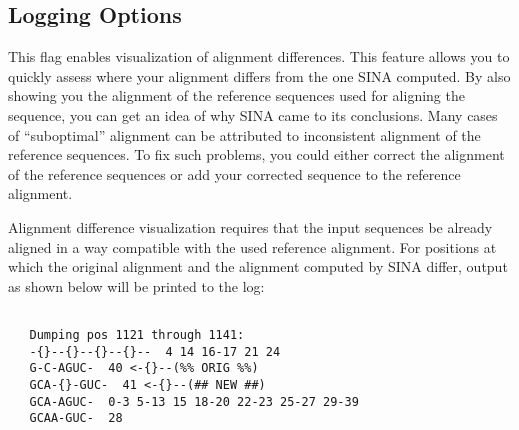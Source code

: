\documentclass[english,a4paper]{article}
\begin{document}
\subsection{Logging Options}
\begin{Description}
\item[\Opt{-{}-show-diff}] 
This flag enables visualization of alignment differences. This feature allows you to 
quickly assess where your alignment differs from the one SINA computed. By also showing you the alignment of 
the reference sequences used for aligning the sequence, you can get an idea of why SINA came to its conclusions.
Many cases of ``suboptimal'' alignment can be attributed to inconsistent alignment of the reference sequences. 
To fix such problems, you could either correct the alignment of the reference sequences or add your corrected
sequence to the reference alignment. 

Alignment difference visualization requires that the input sequences be 
already aligned in a way compatible with the used reference alignment. For positions at which the original alignment and
the alignment computed by SINA differ, output as shown below will be printed to the log:
\begin{verbatim}

   Dumping pos 1121 through 1141:
   -{}--{}--{}--{}--  4 14 16-17 21 24
   G-C-AGUC-  40 <-{}--(%% ORIG %%)
   GCA-{}-GUC-  41 <-{}--(## NEW ##)
   GCA-AGUC-  0-3 5-13 15 18-20 22-23 25-27 29-39
   GCAA-GUC-  28
\end{verbatim}


\end{Description}
\end{document}
